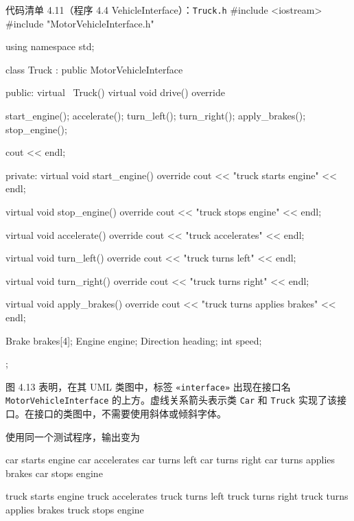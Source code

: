 \begin{codeboxt}{代码清单 4.11（程序 4.4 VehicleInterface）：\texttt{Truck.h}}
#include <iostream>
#include "MotorVehicleInterface.h"

using namespace std;

class Truck : public MotorVehicleInterface
{
public:
    virtual ~Truck() {}
    virtual void drive() override
    {
        start_engine();
        accelerate();
        turn_left();
        turn_right();
        apply_brakes();
        stop_engine();

        cout << endl;
    }

private:
    virtual void start_engine() override
    {
        cout << "truck starts engine" << endl;
    }

    virtual void stop_engine() override
    {
        cout << "truck stops engine" << endl;
    }

    virtual void accelerate() override
    {
        cout << "truck accelerates" << endl;
    }

    virtual void turn_left() override
    {
        cout << "truck turns left" << endl;
    }

    virtual void turn_right() override
    {
        cout << "truck turns right" << endl;
    }

    virtual void apply_brakes() override
    {
        cout << "truck turns applies brakes" << endl;
    }

    Brake brakes[4];
    Engine engine;
    Direction heading;
    int speed;
};
\end{codeboxt}

图 4.13 表明，在其 UML 类图中，标签 \texttt{«interface»} 出现在接口名 \texttt{Motor\allowbreak{}Vehicle\allowbreak{}Interface} 的上方。虚线关系箭头表示类 \texttt{Car} 和 \texttt{Truck} 实现了该接口。在接口的类图中，不需要使用斜体或倾斜字体。


使用同一个测试程序，输出变为

\begin{codebox}
car starts engine
car accelerates
car turns left
car turns right
car turns applies brakes
car stops engine

truck starts engine
truck accelerates
truck turns left
truck turns right
truck turns applies brakes
truck stops engine
\end{codebox}

